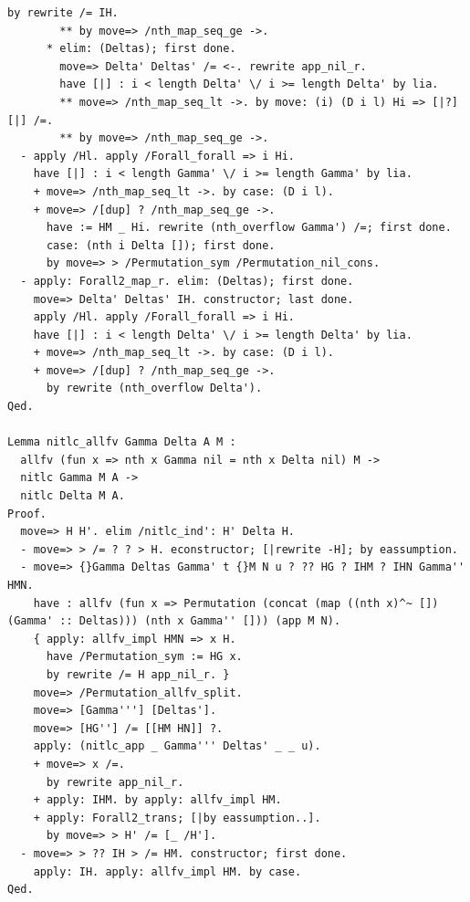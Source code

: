 \documentclass[10pt,a4paper]{article}
\begin{document}
\begin{lstlisting}[style=authorcoq]
           by rewrite /= IH.
        ** by move=> /nth_map_seq_ge ->.
      * elim: (Deltas); first done.
        move=> Delta' Deltas' /= <-. rewrite app_nil_r.
        have [|] : i < length Delta' \/ i >= length Delta' by lia.
        ** move=> /nth_map_seq_lt ->. by move: (i) (D i l) Hi => [|?] [|] /=.
        ** by move=> /nth_map_seq_ge ->.
  - apply /Hl. apply /Forall_forall => i Hi.
    have [|] : i < length Gamma' \/ i >= length Gamma' by lia.
    + move=> /nth_map_seq_lt ->. by case: (D i l).
    + move=> /[dup] ? /nth_map_seq_ge ->.
      have := HM _ Hi. rewrite (nth_overflow Gamma') /=; first done.
      case: (nth i Delta []); first done.
      by move=> > /Permutation_sym /Permutation_nil_cons.
  - apply: Forall2_map_r. elim: (Deltas); first done.
    move=> Delta' Deltas' IH. constructor; last done.
    apply /Hl. apply /Forall_forall => i Hi.
    have [|] : i < length Delta' \/ i >= length Delta' by lia.
    + move=> /nth_map_seq_lt ->. by case: (D i l).
    + move=> /[dup] ? /nth_map_seq_ge ->.
      by rewrite (nth_overflow Delta').
Qed.

Lemma nitlc_allfv Gamma Delta A M :
  allfv (fun x => nth x Gamma nil = nth x Delta nil) M ->
  nitlc Gamma M A ->
  nitlc Delta M A.
Proof.
  move=> H H'. elim /nitlc_ind': H' Delta H.
  - move=> > /= ? ? > H. econstructor; [|rewrite -H]; by eassumption.
  - move=> {}Gamma Deltas Gamma' t {}M N u ? ?? HG ? IHM ? IHN Gamma'' HMN.
    have : allfv (fun x => Permutation (concat (map ((nth x)^~ []) (Gamma' :: Deltas))) (nth x Gamma'' [])) (app M N).
    { apply: allfv_impl HMN => x H.
      have /Permutation_sym := HG x.
      by rewrite /= H app_nil_r. }
    move=> /Permutation_allfv_split.
    move=> [Gamma'''] [Deltas'].
    move=> [HG''] /= [[HM HN]] ?.
    apply: (nitlc_app _ Gamma''' Deltas' _ _ u).
    + move=> x /=.
      by rewrite app_nil_r.
    + apply: IHM. by apply: allfv_impl HM.
    + apply: Forall2_trans; [|by eassumption..].
      by move=> > H' /= [_ /H'].
  - move=> > ?? IH > /= HM. constructor; first done.
    apply: IH. apply: allfv_impl HM. by case.
Qed.


\end{lstlisting}
\end{document}
